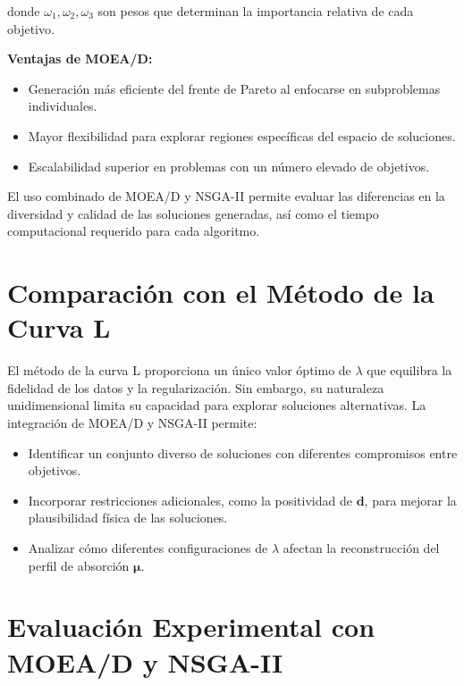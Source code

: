 donde \( \omega_1, \omega_2, \omega_3 \) son pesos que determinan la importancia relativa de cada objetivo.

\textbf{Ventajas de MOEA/D:}
\begin{itemize}
    \item Generación más eficiente del frente de Pareto al enfocarse en subproblemas individuales.
    \item Mayor flexibilidad para explorar regiones específicas del espacio de soluciones.
    \item Escalabilidad superior en problemas con un número elevado de objetivos.
\end{itemize}

El uso combinado de MOEA/D y NSGA-II permite evaluar las diferencias en la diversidad y calidad de las soluciones generadas, así como el tiempo computacional requerido para cada algoritmo.

\section{Comparación con el Método de la Curva L} \label{sec:method:comparison}

El método de la curva L proporciona un único valor óptimo de \( \lambda \) que equilibra la fidelidad de los datos y la regularización. Sin embargo, su naturaleza unidimensional limita su capacidad para explorar soluciones alternativas. La integración de MOEA/D y NSGA-II permite:
\begin{itemize}
    \item Identificar un conjunto diverso de soluciones con diferentes compromisos entre objetivos.
    \item Incorporar restricciones adicionales, como la positividad de \( \mathbf{d} \), para mejorar la plausibilidad física de las soluciones.
    \item Analizar cómo diferentes configuraciones de \( \lambda \) afectan la reconstrucción del perfil de absorción \( \mathbf{\mu} \).
\end{itemize}

\section{Evaluación Experimental con MOEA/D y NSGA-II} \label{sec:method:moead_eval}

